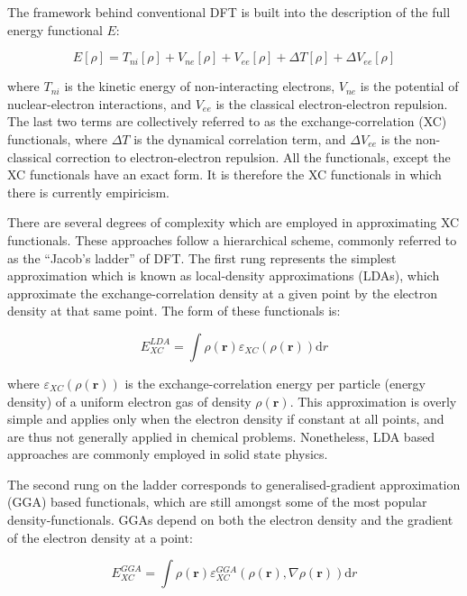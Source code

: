 The framework behind conventional DFT is built into the description of the full energy functional $E$:

\begin{equation}
  E[\rho] = T_{ni}[\rho] + V_{ne}[\rho] + V_{ee}[\rho] + \Delta T[\rho] + \Delta V_{ee}[\rho]
\end{equation}

\noindent where $T_{ni}$ is the kinetic energy of non-interacting electrons, $V_{ne}$ is the potential of nuclear-electron interactions, and $V_{ee}$ is the classical electron-electron repulsion. The last two terms are collectively referred to as the exchange-correlation (XC) functionals, where $\Delta T$ is the dynamical correlation term, and $\Delta V_{ee}$ is the non-classical correction to electron-electron repulsion. All the functionals, except the XC functionals have an exact form. It is therefore the XC functionals in which there is currently empiricism.

There are several degrees of complexity which are employed in approximating XC functionals. These approaches follow a hierarchical scheme, commonly referred to as the ``Jacob's ladder'' of DFT. The first rung represents the simplest approximation which is known as local-density approximations (LDAs), which approximate the exchange-correlation density at a given point by the electron density at that same point. The form of these functionals is:

\begin{equation}
  E_{XC}^{LDA} = \int \rho (\mathbf{r}) \varepsilon_{XC} (\rho(\mathbf{r})) \mathrm{d}r
\end{equation}

 \noindent where $\varepsilon_{XC}(\rho(\mathbf{r}))$ is the exchange-correlation energy per particle (energy density) of a uniform electron gas of density $\rho(\mathbf{r})$. This approximation is overly simple and applies only when the electron density if constant at all points, and are thus not generally applied in chemical problems. Nonetheless, LDA based approaches are commonly employed in solid state physics.

The second rung on the ladder corresponds to generalised-gradient approximation (GGA) based functionals, which are still amongst some of the most popular density-functionals. GGAs depend on both the electron density and the gradient of the electron density at a point:

\begin{equation}
  E_{XC}^{GGA} = \int \rho(\mathbf{r}) \varepsilon_{XC}^{GGA}(\rho(\mathbf{r}), \nabla \rho(\mathbf{r})) \mathrm{d}r
\end{equation}

